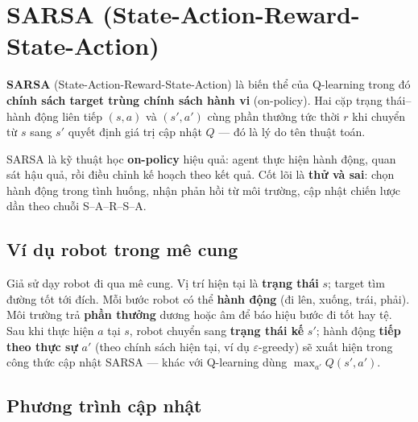 \section{SARSA (State-Action-Reward-State-Action)}
\label{sec:sarsa}

\begin{dinhnghia}[title={SARSA}]
\textbf{SARSA} (State-Action-Reward-State-Action) là biến thể của Q-learning trong đó \textbf{chính sách target trùng chính sách hành vi} (on-policy). Hai cặp trạng thái--hành động liên tiếp $(s,a)$ và $(s',a')$ cùng phần thưởng tức thời $r$ khi chuyển từ $s$ sang $s'$ quyết định giá trị cập nhật $Q$ --- đó là lý do tên thuật toán.
\end{dinhnghia}

\begin{ynghia}[title={Ý tưởng học thử--sai}]
SARSA là kỹ thuật học \textbf{on-policy} hiệu quả: agent thực hiện hành động, quan sát hậu quả, rồi điều chỉnh kế hoạch theo kết quả. Cốt lõi là \textbf{thử và sai}: chọn hành động trong tình huống, nhận phản hồi từ môi trường, cập nhật chiến lược dần theo chuỗi S--A--R--S--A.
\end{ynghia}

\subsection{Ví dụ robot trong mê cung}

\begin{vidu}[title={Robot đi mê cung}]
Giả sử dạy robot đi qua mê cung. Vị trí hiện tại là \textbf{trạng thái} $s$; target tìm đường tốt tới đích. Mỗi bước robot có thể \textbf{hành động} (đi lên, xuống, trái, phải). Môi trường trả \textbf{phần thưởng} dương hoặc âm để báo hiệu bước đi tốt hay tệ. Sau khi thực hiện $a$ tại $s$, robot chuyển sang \textbf{trạng thái kế} $s'$; hành động \textbf{tiếp theo thực sự} $a'$ (theo chính sách hiện tại, ví dụ $\varepsilon$-greedy) sẽ xuất hiện trong công thức cập nhật SARSA --- khác với Q-learning dùng $\max_{a'} Q(s',a')$.
\end{vidu}


\subsection{Phương trình cập nhật}

